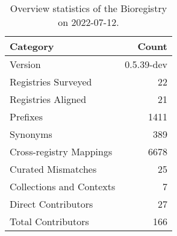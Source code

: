 \begin{table}
\centering
\caption{Overview statistics of the Bioregistry on 2022-07-12.}
\label{tab:bioregistry-summary}
\begin{tabular}{lr}
\toprule
                Category &      Count \\
\midrule
                 Version & 0.5.39-dev \\
     Registries Surveyed &         22 \\
      Registries Aligned &         21 \\
                Prefixes &       1411 \\
                Synonyms &        389 \\
 Cross-registry Mappings &       6678 \\
      Curated Mismatches &         25 \\
Collections and Contexts &          7 \\
     Direct Contributors &         27 \\
      Total Contributors &        166 \\
\bottomrule
\end{tabular}
\end{table}
